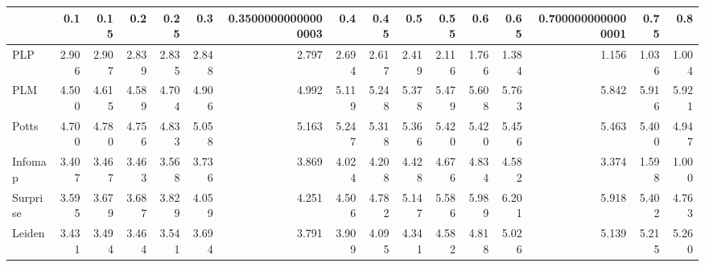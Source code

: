 \begin{tabular}{lrrrrrrrrrrrrrrr}
\toprule
{} &   0.1 &  0.15 &   0.2 &  0.25 &   0.3 & 0.35000000000000003 &   0.4 &  0.45 &   0.5 &  0.55 &   0.6 &  0.65 & 0.7000000000000001 &  0.75 &   0.8 \\
\midrule
PLP      & 2.906 & 2.907 & 2.839 & 2.835 & 2.848 &               2.797 & 2.694 & 2.617 & 2.419 & 2.116 & 1.766 & 1.384 &              1.156 & 1.036 & 1.004 \\
PLM      & 4.500 & 4.615 & 4.589 & 4.704 & 4.906 &               4.992 & 5.119 & 5.248 & 5.378 & 5.479 & 5.608 & 5.763 &              5.842 & 5.916 & 5.921 \\
Potts    & 4.700 & 4.780 & 4.756 & 4.833 & 5.058 &               5.163 & 5.247 & 5.318 & 5.366 & 5.420 & 5.420 & 5.456 &              5.463 & 5.400 & 4.947 \\
Infomap  & 3.407 & 3.467 & 3.463 & 3.568 & 3.736 &               3.869 & 4.024 & 4.208 & 4.428 & 4.676 & 4.834 & 4.582 &              3.374 & 1.598 & 1.000 \\
Surprise & 3.595 & 3.679 & 3.687 & 3.829 & 4.059 &               4.251 & 4.506 & 4.782 & 5.147 & 5.586 & 5.989 & 6.201 &              5.918 & 5.402 & 4.763 \\
Leiden   & 3.431 & 3.494 & 3.464 & 3.541 & 3.694 &               3.791 & 3.909 & 4.095 & 4.341 & 4.582 & 4.818 & 5.026 &              5.139 & 5.215 & 5.260 \\
\bottomrule
\end{tabular}
